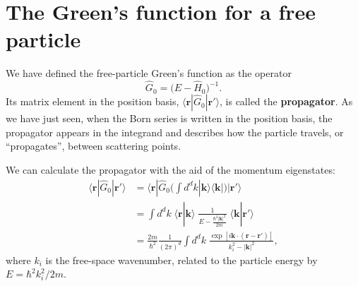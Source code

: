 \documentclass[pra,12pt]{revtex4}
\begin{document}
\section{The Green's function for a free particle}
  
We have defined the free-particle Green's function as the operator
$$\hat{G}_0=\big(E-\hat{H}_0\big)^{-1}.$$
Its matrix element in the position basis,
$\langle\mathbf{r}|\hat{G}_0|\mathbf{r}'\rangle$, is called the
\textbf{propagator}.  As we have just seen, when the Born series is
written in the position basis, the propagator appears in the integrand
and describes how the particle travels, or ``propagates'', between
scattering points.

We can calculate the propagator with the aid of the momentum
eigenstates:
$$\begin{aligned}\langle\mathbf{r}|\hat{G}_0|\mathbf{r}'\rangle &=
  \langle\mathbf{r}|\hat{G}_0 \Big(\int d^dk |\mathbf{k}\rangle\langle\mathbf{k}| \Big) |\mathbf{r}'\rangle \\ &= \int d^dk \; \langle\mathbf{r}|\mathbf{k}\rangle \; \frac{1}{E-\frac{\hbar^2|\mathbf{k}|^2}{2m}} \; \langle\mathbf{k}|\mathbf{r}'\rangle \\ &= \frac{2m}{\hbar^2} \frac{1}{(2\pi)^d} \int d^dk \; \frac{\exp\left[i\mathbf{k}\cdot (\mathbf{r}-\mathbf{r}')\right]}{k_i^2-|\mathbf{k}|^2},\end{aligned}$$
where $k_i$ is the free-space wavenumber, related to the
particle energy by $E = \hbar^2 k_i^2/2m$.
\end{document}
